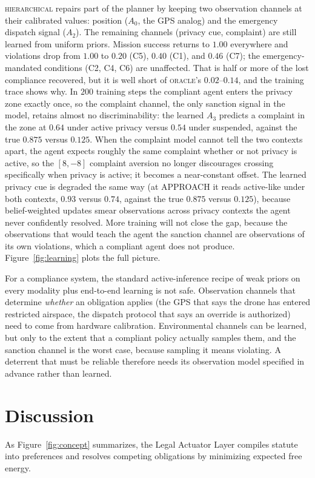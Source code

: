 \documentclass[10pt,twocolumn]{article}
\begin{document}
\textsc{hierarchical} repairs part of the planner by keeping two observation channels at their calibrated values: position ($A_0$, the GPS analog) and the emergency dispatch signal ($A_2$). The remaining channels (privacy cue, complaint) are still learned from uniform priors. Mission success returns to $1.00$ everywhere and violations drop from $1.00$ to $0.20$ (C5), $0.40$ (C1), and $0.46$ (C7); the emergency-mandated conditions (C2, C4, C6) are unaffected. That is half or more of the lost compliance recovered, but it is well short of \textsc{oracle}'s $0.02$--$0.14$, and the training trace shows why. In $200$ training steps the compliant agent enters the privacy zone exactly once, so the complaint channel, the only sanction signal in the model, retains almost no discriminability: the learned $A_3$ predicts a complaint in the zone at $0.64$ under active privacy versus $0.54$ under suspended, against the true $0.875$ versus $0.125$. When the complaint model cannot tell the two contexts apart, the agent expects roughly the same complaint whether or not privacy is active, so the $[8, -8]$ complaint aversion no longer discourages crossing specifically when privacy is active; it becomes a near-constant offset. The learned privacy cue is degraded the same way (at APPROACH it reads active-like under both contexts, $0.93$ versus $0.74$, against the true $0.875$ versus $0.125$), because belief-weighted updates smear observations across privacy contexts the agent never confidently resolved. More training will not close the gap, because the observations that would teach the agent the sanction channel are observations of its own violations, which a compliant agent does not produce. Figure~\ref{fig:learning} plots the full picture.


For a compliance system, the standard active-inference recipe of weak priors on every modality plus end-to-end learning is not safe. Observation channels that determine \textit{whether} an obligation applies (the GPS that says the drone has entered restricted airspace, the dispatch protocol that says an override is authorized) need to come from hardware calibration. Environmental channels can be learned, but only to the extent that a compliant policy actually samples them, and the sanction channel is the worst case, because sampling it means violating. A deterrent that must be reliable therefore needs its observation model specified in advance rather than learned.


\section{Discussion}
As Figure~\ref{fig:concept} summarizes, the Legal Actuator Layer compiles statute into preferences and resolves competing obligations by minimizing expected free energy.
\end{document}
